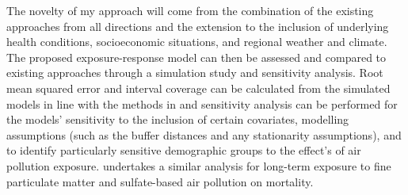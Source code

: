 The novelty of my approach will come from the combination of the existing approaches from all directions and the extension to the inclusion of underlying health conditions, socioeconomic situations, and regional weather and climate. The proposed exposure-response model can then be assessed and compared to existing approaches through a simulation study and sensitivity analysis. Root mean squared error and interval coverage can be calculated from the simulated models in line with the methods in \cite{Hoskovec2021ModelStudy} and sensitivity analysis can be performed for the models' sensitivity to the inclusion of certain covariates, modelling assumptions (such as the buffer distances and any stationarity assumptions), and to identify particularly sensitive demographic groups to the effect's of air pollution exposure. \cite{Krewski2005ReanalysisAnalysis} undertakes a similar analysis for long-term exposure to fine particulate matter and sulfate-based air pollution on mortality.

